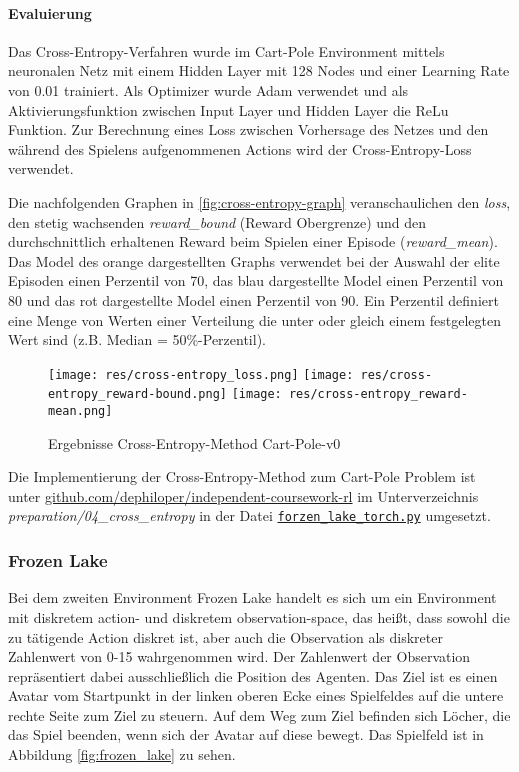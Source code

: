 \documentclass[11pt]{scrartcl}
\begin{document}
\paragraph*{Evaluierung}
\noindent
\newline
Das Cross-Entropy-Verfahren wurde im Cart-Pole Environment mittels neuronalen Netz mit
einem Hidden Layer mit 128 Nodes und einer Learning Rate von 0.01 trainiert. Als
Optimizer wurde Adam verwendet und als Aktivierungsfunktion zwischen Input Layer und
Hidden Layer die ReLu Funktion. Zur Berechnung eines Loss zwischen Vorhersage des Netzes
und den während des Spielens aufgenommenen Actions wird der Cross-Entropy-Loss verwendet.

Die nachfolgenden Graphen in \autoref{fig:cross-entropy-graph} veranschaulichen den
\textit{loss}, den stetig wachsenden \textit{reward\_bound} (Reward Obergrenze) und den
durchschnittlich erhaltenen Reward beim Spielen einer Episode (\textit{reward\_mean}).
Das Model des orange dargestellten Graphs verwendet bei der Auswahl der elite Episoden
einen Perzentil von 70, das blau dargestellte Model einen Perzentil von 80 und das
rot dargestellte Model einen Perzentil von 90. Ein Perzentil definiert eine Menge von
Werten einer Verteilung die unter oder gleich einem festgelegten Wert sind (z.B. Median 
= 50\%-Perzentil). 

\begin{figure}[htp]
\centering
\texttt{[image: res/cross-entropy\_loss.png]}
\texttt{[image: res/cross-entropy\_reward-bound.png]}
\texttt{[image: res/cross-entropy\_reward-mean.png]}
\caption{Ergebnisse Cross-Entropy-Method Cart-Pole-v0}
\label{fig:cross-entropy-graph}
\end{figure}

Die Implementierung der Cross-Entropy-Method zum Cart-Pole Problem ist unter
\url{github.com/dephiloper/independent-coursework-rl} im Unterverzeichnis 
\textit{preparation/04\_cross\_entropy} in der Datei
\href{https://github.com/dephiloper/independent-coursework-rl/blob/master/preparation/04_cross_entropy/cart_pole_torch.py}{\nolinkurl{forzen\_lake\_torch.py}}
umgesetzt. %


\subsubsection{Frozen Lake}
\label{sec:frozen-lake}
Bei dem zweiten Environment Frozen Lake handelt es sich um ein Environment mit diskretem action-
und diskretem observation-space, das heißt, dass sowohl die zu tätigende Action diskret ist,
aber auch die Observation als diskreter Zahlenwert von 0-15 wahrgenommen wird. Der Zahlenwert
der Observation repräsentiert dabei ausschließlich die Position des Agenten. Das Ziel ist es
einen Avatar vom Startpunkt in der linken oberen Ecke eines Spielfeldes auf die untere rechte
Seite zum Ziel zu steuern. Auf dem Weg zum Ziel befinden sich Löcher, die das Spiel beenden, wenn
sich der Avatar auf diese bewegt. Das Spielfeld ist in Abbildung \ref{fig:frozen_lake} zu sehen.
\end{document}
